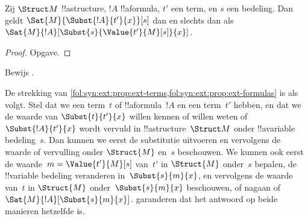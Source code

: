\documentclass[../../../include/open-logic-section]{subfiles}
\begin{document}
\begin{prop} Zij $\Struct M$
!!a{structure}, $!A$ !!a{formula}, $t'$ een term, en $s$ een bedeling.
Dan geldt $\Sat{M}{\Subst{!A}{t'}{x}}[s]$ dan en slechts dan als
$\Sat{M}{!A}[\Subst{s}{\Value{t'}{M}[s]}{x}]$.
\end{prop}

\begin{proof}
Opgave.
\end{proof}

\begin{prob}
Bewijs .
\end{prob}

\begin{explain}
  De strekking van
  \cref{fol:syn:ext:prop:ext-terms,fol:syn:ext:prop:ext-formulas} is
  als volgt. Stel dat we een term~$t$ of !!a{formula}~$!A$ en een
  term~$t'$ hebben, en dat we de waarde van $\Subst{t}{t'}{x}$ willen
  kennen of willen weten of $\Subst{!A}{t'}{x}$ wordt vervuld in
  !!a{structure}~$\Struct M$ onder !!a{variable} bedeling~$s$.
  Dan kunnen we eerst de substitutie uitvoeren en vervolgens de
  waarde of vervulling onder $\Struct{M}$ en~$s$ beschouwen. We kunnen
  ook eerst de waarde~$m = \Value{t'}{M}[s]$ van~$t'$ in
  $\Struct{M}$ onder~$s$ bepalen, de !!{variable} bedeling veranderen
  in~$\Subst{s}{m}{x}$, en vervolgens de waarde van~$t$ in
  $\Struct{M}$ onder~$\Subst{s}{m}{x}$ beschouwen, of nagaan of
  $\Sat{M}{!A}[\Subst{s}{m}{x}]$.
  garanderen dat het antwoord op beide manieren hetzelfde is.
\end{explain}
\end{document}
